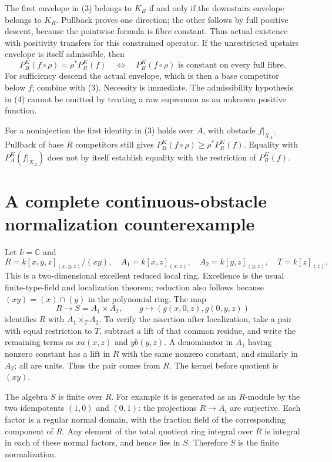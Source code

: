 The first envelope in (3) belongs to \(K_B\) if and only if the
downstairs envelope belongs to \(K_R\). Pullback proves one direction;
the other follows by full positive descent, because the pointwise
formula is fibre constant. Thus actual existence with positivity
transfers for this constrained operator.
If the unrestricted upstairs envelope is itself admissible, then
\[
 P_B^K(f\circ\rho)=\rho^*P_R^K(f)
 \quad\Longleftrightarrow\quad
 P_B^K(f\circ\rho)\text{ is constant on every full fibre}.        \tag{4}
\]
For sufficiency descend the actual envelope, which is then a base
competitor below \(f\); combine with (3). Necessity is immediate.
The admissibility hypothesis in (4) cannot be omitted by treating a
raw supremum as an unknown positive function.

For a noninjection the first identity in (3) holds over \(A\),
with obstacle \(f|_{X_A}\). Pullback of base \(R\) competitors
still gives \(P_B^K(f\circ\rho)\geq\rho^*P_R^K(f)\).
Equality with \(P_A^K(f|_{X_A})\) does not by itself establish
equality with the restriction of \(P_R^K(f)\).

\section{A complete continuous-obstacle normalization counterexample}
\label{sec:counter}
Let \(k=\mathbb C\) and
\[
 R=k[x,y,z]_{(x,y,z)}/(xy),\quad
 A_1=k[x,z]_{(x,z)},\quad A_2=k[y,z]_{(y,z)},\quad
 T=k[z]_{(z)}.
                                                               \tag{5}
\]
This is a two-dimensional excellent reduced local ring. Excellence
is the usual finite-type-field and localization theorem; reduction
also follows because \((xy)=(x)\cap(y)\) in the polynomial ring.
The map
\[
 R\longrightarrow S=A_1\times A_2,\qquad
 g\longmapsto(g(x,0,z),g(0,y,z))
                                                               \tag{6}
\]
identifies \(R\) with \(A_1\times_T A_2\).
To verify the assertion after localization, take a pair with equal
restriction to \(T\), subtract a lift of that common residue, and
write the remaining terms as \(xa(x,z)\) and \(yb(y,z)\).
A denominator in \(A_1\) having nonzero constant has a lift in \(R\)
with the same nonzero constant, and similarly in \(A_2\); all are
units. Thus the pair comes from \(R\). The kernel before quotient is
\((xy)\).

The algebra \(S\) is finite over \(R\). For example it is generated
as an \(R\)-module by the two idempotents \((1,0)\) and \((0,1)\):
the projections \(R\to A_i\) are surjective.
Each factor is a regular normal domain, with the fraction field of
the corresponding component of \(R\). Any element of the total
quotient ring integral over \(R\) is integral in each of these normal
factors, and hence lies in \(S\). Therefore \(S\) is the finite
normalization.

